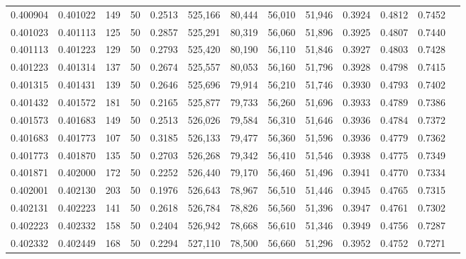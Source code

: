 \begin{tabular}{rrrrrrrrrrrrr}
0.400904 & 0.401022 &   149 &  50 &                                     0.2513 & 525,166 &  80,444 &  56,010 &  51,946 & 0.3924 & 0.4812 & 0.7452 \\
0.401023 & 0.401113 &   125 &  50 &                                     0.2857 & 525,291 &  80,319 &  56,060 &  51,896 & 0.3925 & 0.4807 & 0.7440 \\
0.401113 & 0.401223 &   129 &  50 &                                     0.2793 & 525,420 &  80,190 &  56,110 &  51,846 & 0.3927 & 0.4803 & 0.7428 \\
0.401223 & 0.401314 &   137 &  50 &                                     0.2674 & 525,557 &  80,053 &  56,160 &  51,796 & 0.3928 & 0.4798 & 0.7415 \\
0.401315 & 0.401431 &   139 &  50 &                                     0.2646 & 525,696 &  79,914 &  56,210 &  51,746 & 0.3930 & 0.4793 & 0.7402 \\
0.401432 & 0.401572 &   181 &  50 &                                     0.2165 & 525,877 &  79,733 &  56,260 &  51,696 & 0.3933 & 0.4789 & 0.7386 \\
0.401573 & 0.401683 &   149 &  50 &                                     0.2513 & 526,026 &  79,584 &  56,310 &  51,646 & 0.3936 & 0.4784 & 0.7372 \\
0.401683 & 0.401773 &   107 &  50 &                                     0.3185 & 526,133 &  79,477 &  56,360 &  51,596 & 0.3936 & 0.4779 & 0.7362 \\
0.401773 & 0.401870 &   135 &  50 &                                     0.2703 & 526,268 &  79,342 &  56,410 &  51,546 & 0.3938 & 0.4775 & 0.7349 \\
0.401871 & 0.402000 &   172 &  50 &                                     0.2252 & 526,440 &  79,170 &  56,460 &  51,496 & 0.3941 & 0.4770 & 0.7334 \\
0.402001 & 0.402130 &   203 &  50 &                                     0.1976 & 526,643 &  78,967 &  56,510 &  51,446 & 0.3945 & 0.4765 & 0.7315 \\
0.402131 & 0.402223 &   141 &  50 &                                     0.2618 & 526,784 &  78,826 &  56,560 &  51,396 & 0.3947 & 0.4761 & 0.7302 \\
0.402223 & 0.402332 &   158 &  50 &                                     0.2404 & 526,942 &  78,668 &  56,610 &  51,346 & 0.3949 & 0.4756 & 0.7287 \\
0.402332 & 0.402449 &   168 &  50 &                                     0.2294 & 527,110 &  78,500 &  56,660 &  51,296 & 0.3952 & 0.4752 & 0.7271 \\

\end{tabular}
